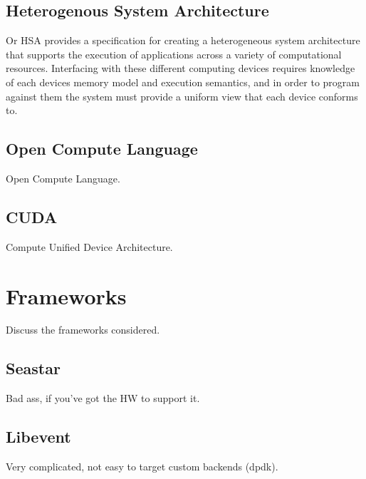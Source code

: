 \subsection{Heterogenous System Architecture}
\label{related:hcp:hsa}
Or HSA \cite{hsa} provides a specification for creating a heterogeneous
system architecture that supports the execution of applications across a variety
of computational resources. Interfacing with these different computing devices
requires knowledge of each devices memory model and execution semantics, and
in order to program against them the system must provide a uniform view that
each device conforms to.


\subsection{Open Compute Language}
\label{related:hcp:ocl}
Open Compute Language.

\subsection{CUDA}
\label{related:hcp:cuda}
Compute Unified Device Architecture.

\section{Frameworks}
\label{related:frameworks}
Discuss the frameworks considered.

\subsection{Seastar}
\label{related:frameworks:seastar}
Bad ass, if you've got the HW to support it.

\subsection{Libevent}
\label{related:frameworks:libevent}
Very complicated, not easy to target custom backends (dpdk).
